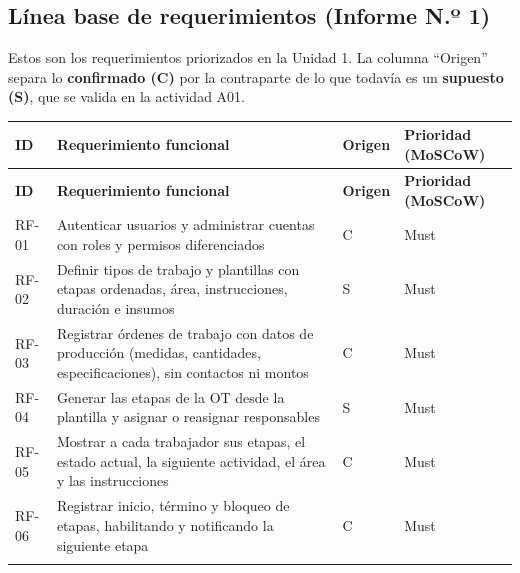 \documentclass[11pt,a4paper]{article}
\begin{document}
\subsection{Línea base de requerimientos (Informe N.º 1)}

Estos son los requerimientos priorizados en la Unidad 1. La columna ``Origen'' separa lo \textbf{confirmado (C)} por la contraparte de lo que todavía es un \textbf{supuesto (S)}, que se valida en la actividad A01.

\begingroup\small
\begin{longtable}{@{}>{\raggedright\arraybackslash\hspace{0pt}}p{}>{\raggedright\arraybackslash\hspace{0pt}}p{}>{\raggedright\arraybackslash\hspace{0pt}}p{}>{\raggedright\arraybackslash\hspace{0pt}}p{}@{}}
\toprule
\textbf{ID} & \textbf{Requerimiento funcional} & \textbf{Origen} & \textbf{Prioridad (MoSCoW)} \\ \midrule
\endfirsthead
\toprule
\textbf{ID} & \textbf{Requerimiento funcional} & \textbf{Origen} & \textbf{Prioridad (MoSCoW)} \\ \midrule
\endhead
\bottomrule
\endlastfoot
\mbox{RF-01} & Autenticar usuarios y administrar cuentas con roles y permisos diferenciados & \mbox{C} & \mbox{Must} \\ \addlinespace[0.25em]
\mbox{RF-02} & Definir tipos de trabajo y plantillas con etapas ordenadas, área, instrucciones, duración e insumos & \mbox{S} & \mbox{Must} \\ \addlinespace[0.25em]
\mbox{RF-03} & Registrar órdenes de trabajo con datos de producción (medidas, cantidades, especificaciones), sin contactos ni montos & \mbox{C} & \mbox{Must} \\ \addlinespace[0.25em]
\mbox{RF-04} & Generar las etapas de la OT desde la plantilla y asignar o reasignar responsables & \mbox{S} & \mbox{Must} \\ \addlinespace[0.25em]
\mbox{RF-05} & Mostrar a cada trabajador sus etapas, el estado actual, la siguiente actividad, el área y las instrucciones & \mbox{C} & \mbox{Must} \\ \addlinespace[0.25em]
\mbox{RF-06} & Registrar inicio, término y bloqueo de etapas, habilitando y notificando la siguiente etapa & \mbox{C} & \mbox{Must} \\ \addlinespace[0.25em]

\end{longtable}
\end{document}
